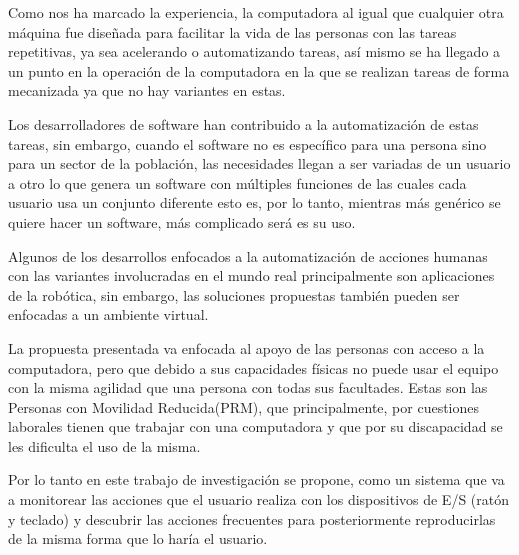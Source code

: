 
Como nos ha marcado la experiencia, la computadora al igual que cualquier otra
 máquina fue diseñada para facilitar la vida de las personas con las tareas
 repetitivas, ya sea acelerando o automatizando tareas, así mismo se ha llegado
 a un punto en la operación de la computadora en la que se realizan tareas de
 forma mecanizada ya que no hay variantes en estas.  

Los desarrolladores de software han contribuido a la automatización de estas
 tareas, sin embargo, cuando el software no es específico para una persona
 sino para un sector de la población, las necesidades llegan a ser variadas
 de un usuario a otro lo que genera un software con múltiples funciones de las
 cuales cada usuario usa un conjunto diferente esto es, por lo tanto,
 mientras más genérico se quiere hacer un software, más complicado será es su
 uso. 

Algunos de los desarrollos enfocados a la automatización de acciones humanas
 con las variantes involucradas en el mundo real principalmente son 
 aplicaciones de la robótica, sin embargo, las soluciones propuestas también
 pueden ser enfocadas a un ambiente virtual.

La propuesta presentada va enfocada al apoyo de las personas con acceso a la
 computadora, pero que debido a sus capacidades físicas no puede usar el equipo
 con la misma agilidad que una persona con todas sus facultades. Estas son las
 Personas con Movilidad Reducida(PRM), que principalmente, por cuestiones
 laborales tienen que trabajar con una computadora y que por su discapacidad se
 les dificulta el uso de la misma.

Por lo tanto en este trabajo de investigación se propone, como un sistema que
 va a monitorear las acciones que el usuario realiza con los dispositivos de
 E/S (ratón y teclado) y  descubrir las acciones frecuentes para posteriormente
 reproducirlas de la misma forma que lo haría el usuario.